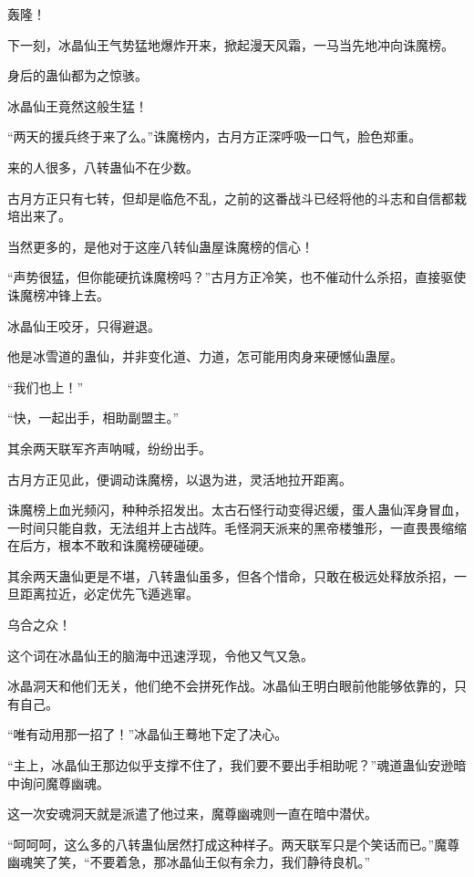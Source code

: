 \begin{this_body}
轰隆！

下一刻，冰晶仙王气势猛地爆炸开来，掀起漫天风霜，一马当先地冲向诛魔榜。

身后的蛊仙都为之惊骇。

冰晶仙王竟然这般生猛！

“两天的援兵终于来了么。”诛魔榜内，古月方正深呼吸一口气，脸色郑重。

来的人很多，八转蛊仙不在少数。

古月方正只有七转，但却是临危不乱，之前的这番战斗已经将他的斗志和自信都栽培出来了。

当然更多的，是他对于这座八转仙蛊屋诛魔榜的信心！

“声势很猛，但你能硬抗诛魔榜吗？”古月方正冷笑，也不催动什么杀招，直接驱使诛魔榜冲锋上去。

冰晶仙王咬牙，只得避退。

他是冰雪道的蛊仙，并非变化道、力道，怎可能用肉身来硬憾仙蛊屋。

“我们也上！”

“快，一起出手，相助副盟主。”

其余两天联军齐声呐喊，纷纷出手。

古月方正见此，便调动诛魔榜，以退为进，灵活地拉开距离。

诛魔榜上血光频闪，种种杀招发出。太古石怪行动变得迟缓，蛋人蛊仙浑身冒血，一时间只能自救，无法组并上古战阵。毛怪洞天派来的黑帝楼雏形，一直畏畏缩缩在后方，根本不敢和诛魔榜硬碰硬。

其余两天蛊仙更是不堪，八转蛊仙虽多，但各个惜命，只敢在极远处释放杀招，一旦距离拉近，必定优先飞遁逃窜。

乌合之众！

这个词在冰晶仙王的脑海中迅速浮现，令他又气又急。

冰晶洞天和他们无关，他们绝不会拼死作战。冰晶仙王明白眼前他能够依靠的，只有自己。

“唯有动用那一招了！”冰晶仙王蓦地下定了决心。

“主上，冰晶仙王那边似乎支撑不住了，我们要不要出手相助呢？”魂道蛊仙安逊暗中询问魔尊幽魂。

这一次安魂洞天就是派遣了他过来，魔尊幽魂则一直在暗中潜伏。

“呵呵呵，这么多的八转蛊仙居然打成这种样子。两天联军只是个笑话而已。”魔尊幽魂笑了笑，“不要着急，那冰晶仙王似有余力，我们静待良机。”

\end{this_body}

